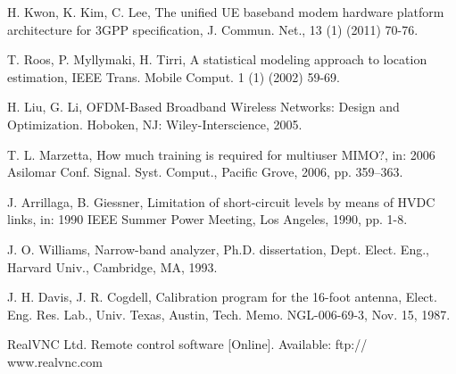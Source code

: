 \documentclass[final,3p,times,twocolumn]{elsarticle}
\begin{document}

% 
% 
% 
% 
% 
% 
% 
% 
% 
% 
% 
% 

\vspace{-0.3cm}

\begin{thebibliography}{1}

 H. Kwon, K. Kim, C. Lee, The unified UE baseband modem hardware platform architecture for 3GPP specification, J. Commun. Net., 13 (1) (2011) 70-76.

 T. Roos, P. Myllymaki, H. Tirri, A statistical modeling approach to location estimation, IEEE Trans. Mobile Comput. 1 (1) (2002) 59-69.

 H. Liu, G. Li, OFDM-Based Broadband Wireless Networks: Design and Optimization. Hoboken, NJ: Wiley-Interscience, 2005.

 T. L. Marzetta, How much training is required for multiuser MIMO?, in: 2006 Asilomar Conf. Signal. Syst. Comput., Pacific Grove, 2006, pp. 359–363.

 J. Arrillaga, B. Giessner, Limitation of short-circuit levels by means of HVDC links, in: 1990 IEEE Summer Power Meeting, Los Angeles, 1990, pp. 1-8.

 J. O. Williams, Narrow-band analyzer, Ph.D. dissertation, Dept. Elect. Eng., Harvard Univ., Cambridge, MA, 1993.

 J. H. Davis, J. R. Cogdell, Calibration program for the 16-foot antenna, Elect. Eng. Res. Lab., Univ. Texas, Austin, Tech. Memo. NGL-006-69-3, Nov. 15, 1987.

 RealVNC Ltd. Remote control software [Online]. Available: ftp:// www.realvnc.com


\end{thebibliography}
\end{document}
